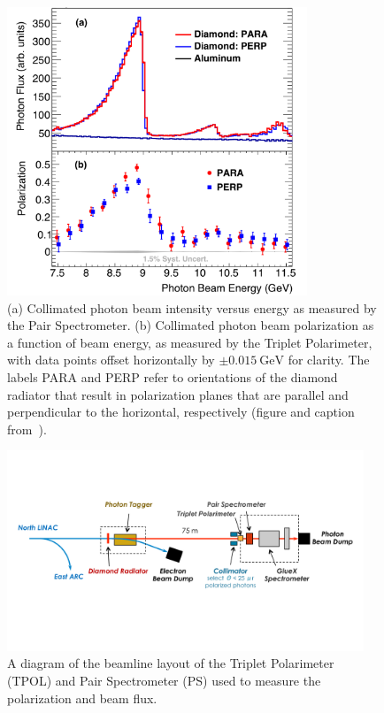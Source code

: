 \begin{figure}
  \begin{center}
    \includegraphics[width=0.8\textwidth]{figures/gluex_polarization.png}
  \end{center}
  \caption{(a) Collimated photon beam intensity versus energy as measured by the Pair Spectrometer. (b) Collimated photon beam polarization as a function of beam energy, as measured by the Triplet Polarimeter, with data points offset horizontally by $\pm\SI{0.015}{\giga\eV}$ for clarity. The labels PARA and PERP refer to orientations of the diamond radiator that result in polarization planes that are parallel and perpendicular to the horizontal, respectively (figure and caption from~\cite{Adhikari2021}).}\label{fig:gluex-polarization}
\end{figure}


\begin{figure}
  \begin{center}
    \includegraphics[width=0.95\textwidth]{figures/gluex_beamline.png}
  \end{center}
  \caption{A diagram of the beamline layout of the Triplet Polarimeter (TPOL) and Pair Spectrometer (PS) used to measure the polarization and beam flux.}\label{fig:gluex-beamline}
\end{figure}

